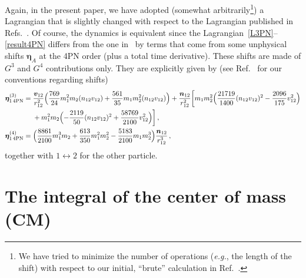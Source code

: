\documentclass[prd,preprint,superscriptaddress,tightenlines,nofootinbib,
  eqsecnum,showpacs]{revtex4}
\begin{document}
Again, in the present paper, we have adopted (somewhat arbitrarily\footnote{We
  have tried to minimize the number of operations (\textit{e.g.}, the length of the shift) with
  respect to our initial, ``brute'' calculation in Ref.~\cite{BBBFMa}.}) a Lagrangian
that is slightly changed with respect to the Lagrangian published in
Refs.~\cite{BBBFMa, BBBFMb}. Of course, the dynamics is equivalent since
the Lagrangian~\eqref{L3PN}--\eqref{result4PN} differs from the one
in~\cite{BBBFMa, BBBFMb} by terms that come from some unphysical shifts
$\bm{\eta}_A$ at the 4PN order (plus a total time derivative). These shifts
are made of $G^3$ and $G^4$ contributions only. They are explicitly given by
(see Ref.~\cite{BBBFMa} for our conventions regarding shifts)
%
\begin{subequations}\label{shifteta}
\begin{align}
\bm{\eta}^{(3)}_{1\,\text{4PN}}={}
&\frac{\bm{v}_{12}}{r_{12}^2} \Bigl(\frac{769}{24} m_{1}^2 m_{2} (n_{12} v_{12})
 + \frac{561}{35} m_{1} m_{2}^2 (n_{12} v_{12})\Bigr)
 + \frac{\bm{n}_{12}}{r_{12}^2} \biggl[m_{1} m_{2}^2 \Bigl(\frac{21719}{1400} (n_{12} v_{12})^2
 -  \frac{2096}{175} v_{12}^{2}\Bigr)\nonumber\\
& + m_{1}^2 m_{2} \Bigl(- \frac{2119}{50} (n_{12} v_{12})^2
 + \frac{58769}{2100} v_{12}^{2}\Bigr)\biggr]\,,
\\
\bm{\eta}^{(4)}_{1\,\text{4PN}}={}
&\Bigl(\frac{8861}{2100} m_{1}^3 m_{2}
 + \frac{613}{350} m_{1}^2 m_{2}^2
 -  \frac{5183}{2100} m_{1} m_{2}^3\Bigr) \frac{\bm{n}_{12}}{r_{12}^3}
\,,
\end{align}\end{subequations}
%
together with $1 \leftrightarrow 2$ for the other particle.

\section{The integral of the center of mass (CM)} 
\label{sec:Gi} 
\end{document}
